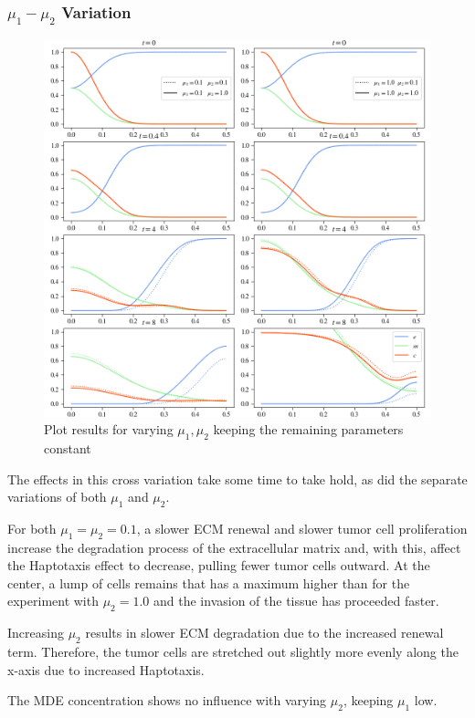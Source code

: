 \subsubsection*{$\mu_1 - \mu_2$ Variation}
\begin{figure}[ht!]
    \centering
    \includegraphics[width=\textwidth]{resources/images/prolif_mu_1_mu_2_variation.png}
    \caption{Plot results for varying $\mu_1, \mu_2$ keeping the remaining parameters constant}
    \label{fig:prolif_mu_1_mu_2_variation}
\end{figure}
The effects in this cross variation take some time to take hold, as did the separate variations of both $\mu_1$ and $\mu_2$. 

For both $\mu_1=\mu_2=0.1$, a slower ECM renewal and slower tumor cell proliferation increase the degradation process of the extracellular matrix and, with this, affect the Haptotaxis effect to decrease, pulling fewer tumor cells outward. At the center, a lump of cells remains that has a maximum higher than for the experiment with $\mu_2=1.0$ and the invasion of the tissue has proceeded faster.

Increasing $\mu_2$ results in slower ECM degradation due to the increased renewal term. Therefore, the tumor cells are stretched out slightly more evenly along the x-axis due to increased Haptotaxis. 

The MDE concentration shows no influence with varying $\mu_2$, keeping $\mu_1$ low.

